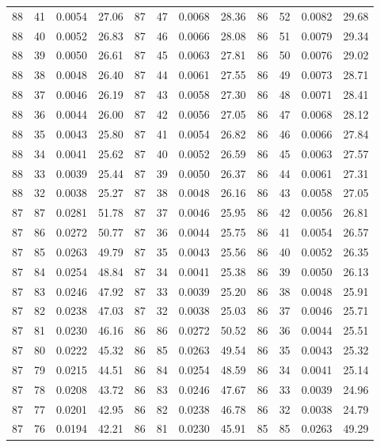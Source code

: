 \begin{tabular}{llll|llll|llll}
88 & 41 & 0.0054 & 27.06 & 87 & 47 & 0.0068 & 28.36 & 86 & 52 & 0.0082 & 29.68\\
88 & 40 & 0.0052 & 26.83 & 87 & 46 & 0.0066 & 28.08 & 86 & 51 & 0.0079 & 29.34\\
88 & 39 & 0.0050 & 26.61 & 87 & 45 & 0.0063 & 27.81 & 86 & 50 & 0.0076 & 29.02\\
88 & 38 & 0.0048 & 26.40 & 87 & 44 & 0.0061 & 27.55 & 86 & 49 & 0.0073 & 28.71\\
88 & 37 & 0.0046 & 26.19 & 87 & 43 & 0.0058 & 27.30 & 86 & 48 & 0.0071 & 28.41\\
88 & 36 & 0.0044 & 26.00 & 87 & 42 & 0.0056 & 27.05 & 86 & 47 & 0.0068 & 28.12\\
88 & 35 & 0.0043 & 25.80 & 87 & 41 & 0.0054 & 26.82 & 86 & 46 & 0.0066 & 27.84\\
88 & 34 & 0.0041 & 25.62 & 87 & 40 & 0.0052 & 26.59 & 86 & 45 & 0.0063 & 27.57\\
88 & 33 & 0.0039 & 25.44 & 87 & 39 & 0.0050 & 26.37 & 86 & 44 & 0.0061 & 27.31\\
88 & 32 & 0.0038 & 25.27 & 87 & 38 & 0.0048 & 26.16 & 86 & 43 & 0.0058 & 27.05\\
87 & 87 & 0.0281 & 51.78 & 87 & 37 & 0.0046 & 25.95 & 86 & 42 & 0.0056 & 26.81\\
87 & 86 & 0.0272 & 50.77 & 87 & 36 & 0.0044 & 25.75 & 86 & 41 & 0.0054 & 26.57\\
87 & 85 & 0.0263 & 49.79 & 87 & 35 & 0.0043 & 25.56 & 86 & 40 & 0.0052 & 26.35\\
87 & 84 & 0.0254 & 48.84 & 87 & 34 & 0.0041 & 25.38 & 86 & 39 & 0.0050 & 26.13\\
87 & 83 & 0.0246 & 47.92 & 87 & 33 & 0.0039 & 25.20 & 86 & 38 & 0.0048 & 25.91\\
87 & 82 & 0.0238 & 47.03 & 87 & 32 & 0.0038 & 25.03 & 86 & 37 & 0.0046 & 25.71\\
87 & 81 & 0.0230 & 46.16 & 86 & 86 & 0.0272 & 50.52 & 86 & 36 & 0.0044 & 25.51\\
87 & 80 & 0.0222 & 45.32 & 86 & 85 & 0.0263 & 49.54 & 86 & 35 & 0.0043 & 25.32\\
87 & 79 & 0.0215 & 44.51 & 86 & 84 & 0.0254 & 48.59 & 86 & 34 & 0.0041 & 25.14\\
87 & 78 & 0.0208 & 43.72 & 86 & 83 & 0.0246 & 47.67 & 86 & 33 & 0.0039 & 24.96\\
87 & 77 & 0.0201 & 42.95 & 86 & 82 & 0.0238 & 46.78 & 86 & 32 & 0.0038 & 24.79\\
87 & 76 & 0.0194 & 42.21 & 86 & 81 & 0.0230 & 45.91 & 85 & 85 & 0.0263 & 49.29\\

\end{tabular}

